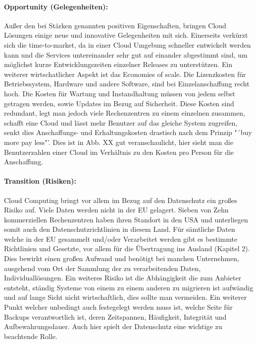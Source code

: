 \paragraph{Opportunity (Gelegenheiten):} Außer den bei Stärken genannten positiven Eigenschaften, bringen Cloud Lösungen einige neue und innovative Gelegenheiten mit sich. Einerseits verkürzt sich die time-to-market, da in einer Cloud Umgebung schneller entwickelt werden kann und die Services untereinander sehr gut auf einander abgestimmt sind, um möglichst kurze Entwicklungszeiten einzelner Releases zu unterstützen. Ein weiterer wirtschatlicher Aspekt ist das Economies of scale. Die Lizenzkosten für Betriebssystem, Hardware und andere Software, sind bei Einzelanschaffung recht hoch. Die Kosten für Wartung und Instandhaltung müssen von jedem selbst getragen werden, sowie Updates im Bezug auf Sicherheit. Diese Kosten sind redundant, legt man jedoch viele Rechenzentren zu einem einzelnen zusammen, schafft eine Cloud und lässt mehr Benutzer auf das gleiche System zugreifen, senkt dies Anschaffungs- und Erhaltungskosten drastisch nach dem Prinzip "´buy more pay less"'. Dies ist in Abb. XX gut veranschaulicht, hier sieht man die Benutzerzahlen einer Cloud im Verhältnis zu den Kosten pro Person für die Anschaffung.

\paragraph{Transition (Risiken):} Cloud Computing bringt vor allem im Bezug auf den Datenschutz ein großes Risiko auf. Viele Daten werden nicht in der EU gelagert. Sieben von Zehn kommerziellen Rechenzentren haben ihren Standort in den USA und unterliegen somit auch den Datenschutzrichtlinien in diesem Land. Für sämtliche Daten welche in der EU gesammelt und/oder Verarbeitet werden gibt es bestimmte Richtlinien und Gesetzte, vor allem für die Übertragung ins Ausland (Kapitel 2). Dies bewirkt einen großen Aufwand und benötigt bei manchen Unternehmen, ausgehend vom Ort der Sammlung der zu verarbeitenden Daten, Individuallösungen. Ein weiteres Risiko ist die Abhängigkeit die zum Anbieter entsteht, ständig Systeme von einem zu einem anderen zu migrieren ist aufwändig und auf lange Sicht nicht wirtschaftlich, dies sollte man vermeiden. Ein weiterer Punkt welcher unbedingt auch festegelegt werden muss ist, welche Seite für Backups verantwortlich ist, deren Zeitspannen, Häufigkeit, Integrität und Aufbewahrungsdauer. Auch hier spielt der Datenschutz eine wichtige zu beachtende Rolle.

